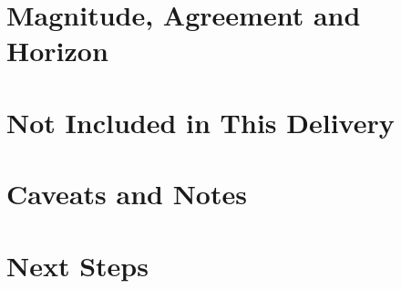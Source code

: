 \documentclass[11pt,a4paper]{article}
\begin{document}
\section{Magnitude, Agreement and Horizon}\label{sec:magnitude}


\section{Not Included in This Delivery}\label{sec:excluded}


\section{Caveats and Notes}\label{sec:caveats}


\section{Next Steps}\label{sec:next}




\end{document}
